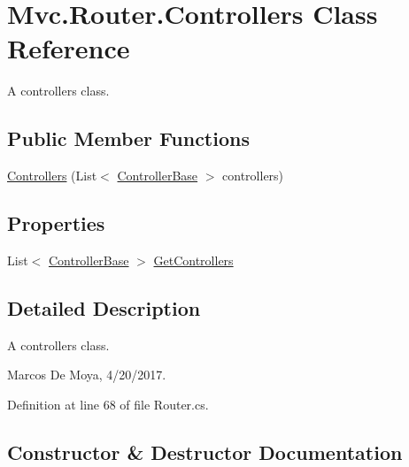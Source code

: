 \hypertarget{class_mvc_1_1_router_1_1_controllers}{}\section{Mvc.\+Router.\+Controllers Class Reference}
\label{class_mvc_1_1_router_1_1_controllers}


A controllers class.  


\subsection*{Public Member Functions}
\begin{DoxyCompactItemize}
\item 
\hyperlink{class_mvc_1_1_router_1_1_controllers_ad48c9d29d129cfa7a1e8b84a215c4214}{Controllers} (List$<$ \hyperlink{class_mvc_1_1_controller_base}{Controller\+Base} $>$ controllers)
\end{DoxyCompactItemize}
\subsection*{Properties}
\begin{DoxyCompactItemize}
\item 
List$<$ \hyperlink{class_mvc_1_1_controller_base}{Controller\+Base} $>$ \hyperlink{class_mvc_1_1_router_1_1_controllers_a8f55fab02be672919959fcae09b4494d}{Get\+Controllers}
\end{DoxyCompactItemize}


\subsection{Detailed Description}
A controllers class. 

Marcos De Moya, 4/20/2017. 

Definition at line 68 of file Router.\+cs.



\subsection{Constructor \& Destructor Documentation}
\mbox{\label{class_mvc_1_1_router_1_1_controllers_ad48c9d29d129cfa7a1e8b84a215c4214}} 
